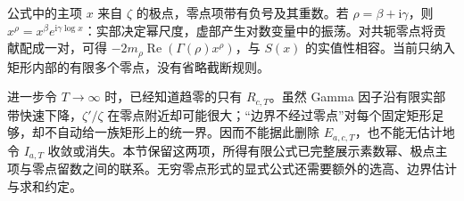 公式中的主项 \(x\) 来自 \(\zeta\) 的极点，零点项带有负号及其重数。若 \(\rho=\beta+\mathrm i\gamma\)，则 \(x^\rho=x^\beta e^{\mathrm i\gamma\log x}\)：实部决定幂尺度，虚部产生对数变量中的振荡。对共轭零点将贡献配成一对，可得 \(-2m_\rho\operatorname{Re}(\Gamma(\rho)x^\rho)\)，与 \(S(x)\) 的实值性相容。当前只纳入矩形内部的有限多个零点，没有省略截断规则。

\ProseParagraphBreak
进一步令 \(T\to\infty\) 时，已经知道趋零的只有 \(R_{c,T}\)。虽然 Gamma 因子沿有限实部带快速下降，\(\zeta'/\zeta\) 在零点附近却可能很大；“边界不经过零点”对每个固定矩形足够，却不自动给一族矩形上的统一界。因而不能据此删除 \(E_{a,c,T}\)，也不能无估计地令 \(I_{a,T}\) 收敛或消失。本节保留这两项，所得有限公式已完整展示素数幂、极点主项与零点留数之间的联系。无穷零点形式的显式公式还需要额外的选高、边界估计与求和约定。
